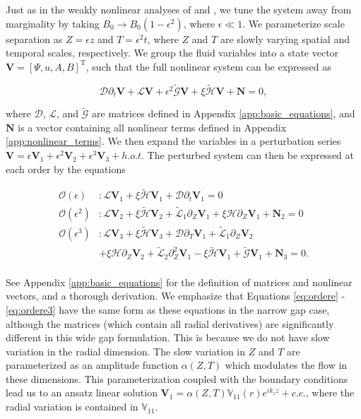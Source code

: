 \documentclass{emulateapj}
\newcommand{\beq}{\begin{equation}}
\newcommand{\eeq}{\end{equation}}
\newcommand{\citei}[1]{\citeauthor{#1} \citeyear{#1}}
\begin{document}
Just as in the weakly nonlinear analyses of \citei{Umurhan:2007hs} and \citei{Clark:2016}, we tune the system away from marginality by taking $B_0 \rightarrow B_0\left(1 - \epsilon^2\right)$, where $\epsilon \ll 1$. We parameterize scale separation as $Z = \epsilon z$ and $T = \epsilon^2 t$, where $Z$ and $T$ are slowly varying spatial and temporal scales, respectively. We group the fluid variables into a state vector $\mathbf{V} = \left[\Psi, u, A, B\right]^{\mathrm{T}}$, such that the full nonlinear system can be expressed as

\beq\label{eq:unperturbed_matrix_eqns}
\mathcal{D}\partial_t\mathbf{V} + \mathcal{L}\mathbf{V} + \epsilon^2 \widetilde{\mathcal{G}} \mathbf{V} + \xi \widetilde{\mathcal{H}} \mathbf{V} +  \mathbf{N} = 0,
\eeq

where $\mathcal{D}$, $\mathcal{L}$, and $\widetilde{\mathcal{G}}$ are matrices defined in Appendix \ref{app:basic_equations}, and $\mathbf{N}$ is a vector containing all nonlinear terms defined in Appendix \ref{app:nonlinear_terms}. We then expand the variables in a perturbation series $\mathbf{V} = \epsilon \mathbf{V}_1 + \epsilon^2 \mathbf{V}_2 + \epsilon^3 \mathbf{V}_3 + h.o.t.$ The perturbed system can then be expressed at each order by the equations

\begin{align}
\mathcal{O}(\epsilon)&: \mathcal{L} \mathbf{V}_1 + \xi \widetilde{\mathcal{H}} \mathbf{V}_1 + \mathcal{D} \partial_t \mathbf{V}_1 = 0 \label{eq:ordere}\\
\mathcal{O}(\epsilon^2)&: \mathcal{L} \mathbf{V}_2 + \xi \widetilde{\mathcal{H}} \mathbf{V}_2 + \widetilde{\mathcal{L}}_1 \partial_Z \mathbf{V}_1 + \xi \mathcal{H} \partial_Z \mathbf{V}_1 + \mathbf{N}_2 = 0 \\\label{eq:ordere2}
\mathcal{O}(\epsilon^3)&: \mathcal{L}\mathbf{V}_3 + \xi \widetilde{\mathcal{H}} \mathbf{V}_3 + \mathcal{D} \partial_T \mathbf{V}_1 + \widetilde{\mathcal{L}}_1 \partial_Z \mathbf{V}_2\nonumber \\ 
&+ \xi \mathcal{H}\partial_Z \mathbf{V}_2 + \widetilde{\mathcal{L}}_2 \partial_Z^2 \mathbf{V}_1 - \xi \widetilde{\mathcal{H}} \mathbf{V}_1 + \widetilde{\mathcal{G}} \mathbf{V}_1 + \mathbf{N}_3 = 0. \\\label{eq:ordere3}
\end{align}

See Appendix \ref{app:basic_equations} for the definition of matrices and nonlinear vectors, and a thorough derivation. We emphasize that Equations \ref{eq:ordere} - \ref{eq:ordere3} have the same form as these equations in the narrow gap case, although the matrices (which contain all radial derivatives) are significantly different in this wide gap formulation. This is because we do not have slow variation in the radial dimension. The slow variation in $Z$ and $T$ are parameterized as an amplitude function $\alpha(Z, T)$ which modulates the flow in these dimensions. This parameterization coupled with the boundary conditions lead us to an ansatz linear solution $\mathbf{V}_1 = \alpha(Z, T) \mathbb{V}_{11}(r) e^{i k_z z} + c.c.$, where the radial variation is contained in $\mathbb{V}_{11}$. 
\end{document}
